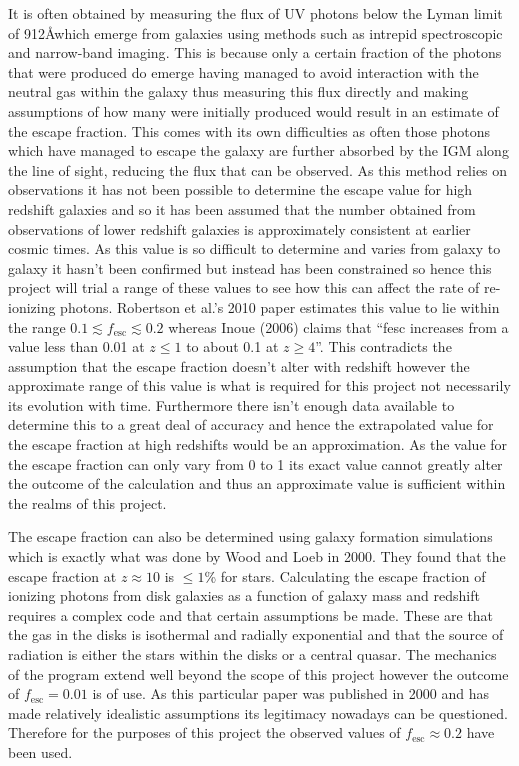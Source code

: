 		It is often obtained by measuring the flux of UV photons below the Lyman limit of 912\AA which emerge from galaxies using methods such as intrepid spectroscopic and narrow-band imaging\cite{robertson2010early}. This is because only a certain fraction of the photons that were produced do emerge having managed to avoid interaction with the neutral gas within the galaxy thus measuring this flux directly and making assumptions of how many were initially produced would result in an estimate of the escape fraction. This comes with its own difficulties as often those photons which have managed to escape the galaxy are further absorbed by the IGM along the line of sight, reducing the flux that can be observed. As this method relies on observations it has not been possible to determine the escape value for high redshift galaxies and so it has been assumed that the number obtained from observations of lower redshift galaxies is approximately consistent at earlier cosmic times. As this value is so difficult to determine and varies from galaxy to galaxy it hasn’t been confirmed but instead has been constrained so hence this project will trial a range of these values to see how this can affect the rate of re-ionizing photons. Robertson et al.’s 2010 paper estimates this value to lie within the range $0.1\lesssim f_\text{esc}\lesssim 0.2$\cite{robertson2010early} whereas Inoue (2006) claims that ``fesc increases from a value less than 0.01 at $z\le 1$ to about 0.1 at $z\ge 4$''\cite{inoue2006escape}. This contradicts the assumption that the escape fraction doesn’t alter with redshift however the approximate range of this value is what is required for this project not necessarily its evolution with time. Furthermore there isn’t enough data available to determine this to a great deal of accuracy and hence the extrapolated value for the escape fraction at high redshifts would be an approximation. As the value for the escape fraction can only vary from 0 to 1 its exact value cannot greatly alter the outcome of the calculation and thus an approximate value is sufficient within the realms of this project.

		The escape fraction can also be determined using galaxy formation simulations which is exactly what was done by Wood and Loeb in 2000. They found that the escape fraction at $z\approx 10$ is $\le1$\% for stars\cite{gnedin2008escape}. Calculating the escape fraction of ionizing photons from disk galaxies as a function of galaxy mass and redshift requires a complex code and that certain assumptions be made. These are that the gas in the disks is isothermal and radially exponential and that the source of radiation is either the stars within the disks or a central quasar. The mechanics of the program extend well beyond the scope of this project however the outcome of $f_\text{esc}=0.01$ is of use. As this particular paper was published in 2000 and has made relatively idealistic assumptions its legitimacy nowadays can be questioned. Therefore for the purposes of this project the observed values of $f_\text{esc}\approx 0.2$ have been used.

